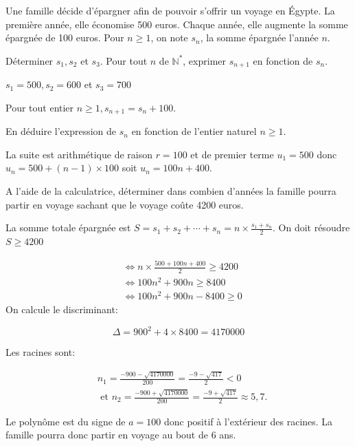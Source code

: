 \documentclass[11pt,a4paper]{article}  %
\begin{document}
Une famille décide d'épargner afin de pouvoir s'offrir un voyage en Égypte.
La première année, elle économise 500 euros. Chaque année, elle augmente la somme épargnée de 100 euros. Pour $n \geqslant 1$, on note $s_n$, la somme épargnée l'année $n$.
\begin{enumMet}
	\item Déterminer $s_1, s_2$ et $s_3$. Pour tout $n$ de $\mathbb{N}^*$, exprimer $s_{n+1}$ en fonction de $s_n$.
	\begin{corrBox}
		$s_1=500, s_2=600$ et $s_3=700$
		
		Pour tout entier $n \geqslant 1, s_{n+1}=s_n+100$.		
	\end{corrBox}
	\item En déduire l'expression de $s_n$ en fonction de l'entier naturel $n \geqslant 1$.
	\begin{corrBox}
		La suite est arithmétique de raison $r=100$ et de premier terme $u_1=500$ donc $u_n=500+(n-1) \times 100$ soit $u_n=100 n+400$.		
	\end{corrBox}
	\item A l'aide de la calculatrice, déterminer dans combien d'années la famille pourra partir en voyage sachant que le voyage coûte 4200 euros.
	\begin{corrBox}
		La somme totale épargnée est $S=s_1+s_2+\cdots+s_n=n \times \frac{s_1+s_n}{2}$. On doit résoudre $S \geqslant 4200$
		
		$$
		\begin{aligned}
			& \Longleftrightarrow n \times \frac{500+100 n+400}{2} \geq 4200 \\
			& \Longleftrightarrow 100 n^2+900 n \geq 8400 \\
			& \Longleftrightarrow 100 n^2+900 n-8400 \geq 0
		\end{aligned}
		$$
		On calcule le discriminant:
		
		$$
		\Delta=900^2+4 \times 8400=4170000
		$$
		
		
		Les racines sont:
		
		$$
		\begin{aligned}
			& n_1=\frac{-900-\sqrt{4170000}}{200}=\frac{-9-\sqrt{417}}{2}<0 \\
			& \text { et } n_2=\frac{-900+\sqrt{4170000}}{200}=\frac{-9+\sqrt{417}}{2} \approx 5,7 .
		\end{aligned}
		$$
		
		
		Le polynôme est du signe de $a=100$ donc positif à l'extérieur des racines.
		La famille pourra donc partir en voyage au bout de 6 ans.
	\end{corrBox}
\end{enumMet}
\end{document}
